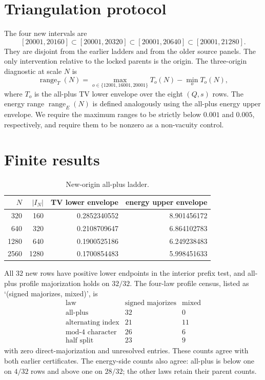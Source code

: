 \documentclass[10pt]{article}
\begin{document}
\section{Triangulation protocol}

The four new intervals are
\[
[20001,20160]\subset[20001,20320]\subset[20001,20640]
\subset[20001,21280].
\]
They are disjoint from the earlier ladders and from the older source panels.
The only intervention relative to the locked parents is the origin.  The
three-origin diagnostic at scale $N$ is
\[
 \operatorname{range}_T(N)=\max_{o\in\{12001,16001,20001\}}T_o(N)
                         -\min_oT_o(N),
\]
where $T_o$ is the all-plus TV lower envelope over the eight $(Q,s)$ rows.
The energy range $\operatorname{range}_E(N)$ is defined analogously using
the all-plus energy upper envelope.  We require the maximum ranges to be
strictly below $0.001$ and $0.005$, respectively, and require them to be
nonzero as a non-vacuity control.

\section{Finite results}

\begin{table}[ht]
\centering
\caption{New-origin all-plus ladder.}
\label{tab:new}
\small
\begin{tabular}{rrrr}
\toprule
$N$ & $|I_N|$ & TV lower envelope & energy upper envelope\\
\midrule
320  & 160  & 0.2852340552 & 8.901456172\\
640  & 320  & 0.2108709647 & 6.864102783\\
1280 & 640  & 0.1900525186 & 6.249238483\\
2560 & 1280 & 0.1700854483 & 5.998451633\\
\bottomrule
\end{tabular}
\end{table}

All $32$ new rows have positive lower endpoints in the interior prefix test,
and all-plus profile majorization holds on $32/32$.  The four-law profile
census, listed as `(signed majorizes, mixed)', is
\[
\begin{array}{c|rr}
\text{law}&\text{signed majorizes}&\text{mixed}\\\hline
\text{all-plus}&32&0\\
\text{alternating index}&21&11\\
\text{mod-4 character}&26&6\\
\text{half split}&23&9
\end{array}
\]
with zero direct-majorization and unresolved entries.  These counts agree
with both earlier certificates.  The energy-side counts also agree: all-plus
is below one on $4/32$ rows and above one on $28/32$; the other laws retain
their parent counts.
\end{document}

